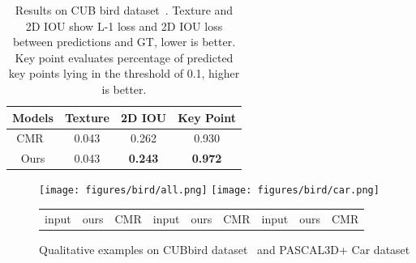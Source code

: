 \documentclass{article}
\begin{document}
\begin{minipage}[t] {0.09\textwidth}
\begin{table*}
\vspace{-3.5mm}
\begin{minipage}{0.45\linewidth}
\vspace{-3mm}
	\begin{center}
{\small
		\addtolength{\tabcolsep}{-2.5pt}
		\begin{tabular}{cccc}
			\toprule
		    Models &Texture& 2D IOU & Key Point \\
		    \toprule
		    CMR~\cite{kanazawa2018learning} & 0.043 & 0.262 &0.930\\
			Ours & 0.043 &\textbf{0.243}&\textbf{0.972}\\
			\bottomrule
		\end{tabular}
		}
	\end{center}
	\end{minipage}
	\hspace{3mm}
	\begin{minipage}{0.52\linewidth}
		
\caption{\footnotesize Results on CUB bird dataset~\cite{cub}. Texture and 2D IOU show L-1 loss and 2D IOU loss between predictions and GT, lower is better. Key point evaluates percentage of predicted key points lying in the threshold of 0.1, higher is better.}
	\label{tbl:real}
		\end{minipage}
		\vspace{-1mm}
\end{table*}


\begin{figure*}[t!]
\vspace{-2.5mm}
\texttt{[image: figures/bird/all.png]}
\texttt{[image: figures/bird/car.png]}
\begin{center}
\vspace{-5mm}
\begin{small}
\begin{tabular}{p{11.4mm}p{11.4mm}p{11.4mm}p{11.4mm}p{11.4mm}p{11.4mm}p{11.4mm}p{11.4mm}p{11.4mm}}
\hspace{1.5mm} input & \hspace{1.8mm} ours & \hspace{1mm} CMR & \hspace{1.5mm} input & \hspace{1.8mm} ours & \hspace{1mm} CMR & \hspace{1.5mm} input & \hspace{1.8mm} ours & \hspace{1mm} CMR 
\end{tabular}
\end{small}
\end{center}
\vspace{-4.0mm}
\caption{\footnotesize{Qualitative examples on CUBbird dataset~\cite{cub}  and PASCAL3D+ Car dataset~\cite{pascal3d}}}
\label{fig:comp_cmr}
\vspace{-4.0mm}
\end{figure*}



\end{minipage}
\end{document}
